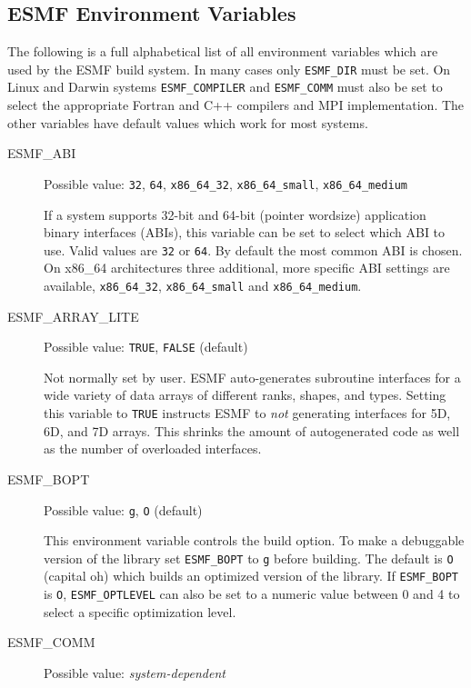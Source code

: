\subsection{ESMF Environment Variables}
\label{EnvironmentVariables}

The following is a full alphabetical list of all environment variables which
are used by the ESMF build system. In many cases only {\tt ESMF\_DIR} must be 
set. On Linux and Darwin systems {\tt ESMF\_COMPILER} and {\tt ESMF\_COMM} must
also be set to select the appropriate Fortran and C++ compilers and MPI 
implementation. The other variables have default values which work for
most systems.

\begin{description}

\item[ESMF\_ABI]
Possible value: {\tt 32}, {\tt 64}, {\tt x86\_64\_32}, {\tt x86\_64\_small}, {\tt x86\_64\_medium}

If a system supports 32-bit and 64-bit (pointer wordsize) application binary
interfaces (ABIs), this variable can be set to select which ABI to use. Valid 
values are {\tt 32} or {\tt 64}. By default the most common ABI is chosen. On
x86\_64 architectures three additional, more specific ABI settings are available,
{\tt x86\_64\_32}, {\tt x86\_64\_small} and {\tt x86\_64\_medium}.

\item[ESMF\_ARRAY\_LITE]
Possible value: {\tt TRUE}, {\tt FALSE} (default)

Not normally set by user. ESMF auto-generates subroutine interfaces for a wide
variety of data arrays of different ranks, shapes, and types. Setting this
variable to {\tt TRUE} instructs ESMF to {\em not} generating interfaces for
5D, 6D, and 7D arrays. This shrinks the amount of autogenerated code as well
as the number of overloaded interfaces.

\item[ESMF\_BOPT] 
Possible value: {\tt g}, {\tt O} (default)

This environment variable controls the build option. To make a debuggable
version of the library set {\tt ESMF\_BOPT} to {\tt g} before building. The 
default is {\tt O} (capital oh) which builds an optimized version of the
library. If {\tt ESMF\_BOPT} is {\tt O}, {\tt ESMF\_OPTLEVEL} can also be set
to a numeric value between 0 and 4 to select a specific optimization level.

\item[ESMF\_COMM]
Possible value: {\em system-dependent}


\end{description}
